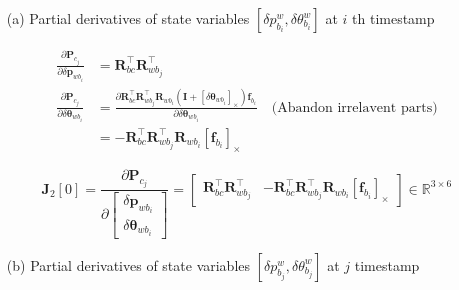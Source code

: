 \documentclass[12pt]{report}   %
\begin{document}
\begin{enumerate}
	
	\item[(a)] Partial derivatives of {\color{blue} state variables $[\delta p^{w}_{b_{i}},\delta \theta ^{w}_{b_{i}}]$ at $i$ th timestamp}

	
	\begin{equation}
	\begin{aligned}
	\frac{\partial \mathbf{P}_{c_{j}}}{\partial \delta \mathbf{p}_{w b_{i}}} 
	&=
	\mathbf{R}_{b c}^{\top} \mathbf{R}_{w b_{j}}^{\top} 
	\\
	\frac{\partial \mathbf{P}_{c_{j}}}{\partial \delta \boldsymbol{\theta}_{w b_{i}}} 
	&=
	\frac{\partial \mathbf{R}_{b c}^{\top} \mathbf{R}_{w b_{j}}^{\top} \mathbf{R}_{w b_{i}}\left(\mathbf{I}+\left[\delta \boldsymbol{\theta}_{wb_{i}}\right]_{\times}\right) \mathbf{f}_{b_{i}}}{\partial \delta \boldsymbol{\theta}_{wb_{i}}} 
	\quad \text{(Abandon irrelavent parts)} \\
	&=
	-\mathbf{R}_{b c}^{\top} \mathbf{R}_{w b_{j}}^{\top} \mathbf{R}_{w b_{i}}\left[\mathbf{f}_{b_{i}}\right]_{\times}
	\end{aligned}
	\end{equation}
	
	\begin{equation}
	\mathbf{J}_2[0] 
	=
	\frac{\partial \mathbf{P}_{c_{j}}}
	{\partial \left[\begin{array}{c}{\delta \mathbf{p}_{w b_{i}}} \\ 
		{\delta \boldsymbol{\theta}_{w b_{i}}}\end{array}\right]} 
	=
	\begin{bmatrix}
	\mathbf{R}_{b c}^{\top} \mathbf{R}_{w b_{j}}^{\top} & 
	-\mathbf{R}_{b c}^{\top} \mathbf{R}_{w b_{j}}^{\top} \mathbf{R}_{w b_{i}}\left[\mathbf{f}_{b_{i}}\right]_{\times}
	\end{bmatrix}
	\in \mathbb{R}^{3 \times 6}
	\end{equation}
	
	\item[(b)] Partial derivatives of {\color{blue} state variables $[\delta p^{w}_{b_{j}},\delta \theta ^{w}_{b_{j}}]$ at $j$ timestamp}
	

\end{enumerate}
\end{document}
